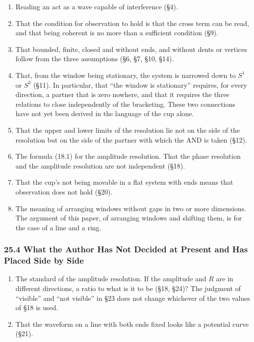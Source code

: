 \documentclass[
  a4paper,
]{article}
\providecommand{\tightlist}{%
  \setlength{\itemsep}{0pt}\setlength{\parskip}{0pt}}
\begin{document}
\begin{enumerate}
\def\labelenumi{\arabic{enumi}.}
\tightlist
\item
  Reading an act as a wave capable of interference (§4).
\item
  That the condition for observation to hold is that the cross term can
  be read, and that being coherent is no more than a sufficient
  condition (§9).
\item
  That bounded, finite, closed and without ends, and without dents or
  vertices follow from the three assumptions (§6, §7, §10, §14).
\item
  That, from the window being stationary, the system is narrowed down to
  \(S^1\) or \(S^3\) (§11). In particular, that ``the window is
  stationary'' requires, for every direction, a partner that is zero
  nowhere, and that it requires the three relations to close
  independently of the bracketing. These two connections have not yet
  been derived in the language of the cup alone.
\item
  That the upper and lower limits of the resolution lie not on the side
  of the resolution but on the side of the partner with which the AND is
  taken (§12).
\item
  The formula (18.1) for the amplitude resolution. That the phase
  resolution and the amplitude resolution are not independent (§18).
\item
  That the cup's not being movable in a flat system with ends means that
  observation does not hold (§20).
\item
  The meaning of arranging windows without gaps in two or more
  dimensions. The argument of this paper, of arranging windows and
  shifting them, is for the case of a line and a ring.
\end{enumerate}

\subsubsection{25.4 What the Author Has Not Decided at Present and Has
Placed Side by
Side}\label{what-the-author-has-not-decided-at-present-and-has-placed-side-by-side}

\begin{enumerate}
\def\labelenumi{\arabic{enumi}.}
\tightlist
\item
  The standard of the amplitude resolution. If the amplitude and \(R\)
  are in different directions, a ratio to what is it to be (§18, §24)?
  The judgment of ``visible'' and ``not visible'' in §23 does not change
  whichever of the two values of §18 is used.
\item
  That the waveform on a line with both ends fixed looks like a
  potential curve (§21).
\end{enumerate}
\end{document}
